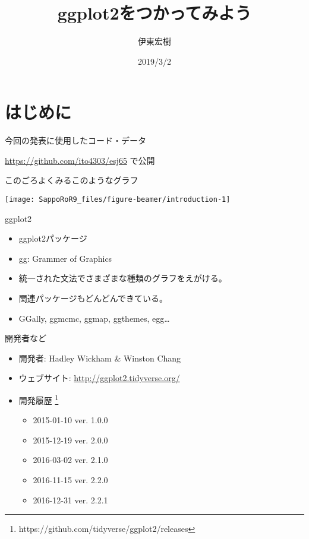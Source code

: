 \documentclass[ignorenonframetext,]{beamer}
\title{ggplot2をつかってみよう}
\author{伊東宏樹}
\date{2019/3/2}
\providecommand{\tightlist}{%
  \setlength{\itemsep}{0pt}\setlength{\parskip}{0pt}}
\begin{document}
\frame{\titlepage}

\section{はじめに}

\begin{frame}{今回の発表に使用したコード・データ}

\url{https://github.com/ito4303/esj65} で公開

\end{frame}

\begin{frame}{このごろよくみるこのようなグラフ}

\texttt{[image: SappoRoR9\_files/figure-beamer/introduction-1]}

\end{frame}

\begin{frame}{ggplot2}

\LARGE

\begin{itemize}[<+->]
\tightlist
\item
  ggplot2パッケージ
\end{itemize}

\normalsize

\begin{itemize}[<+->]
\tightlist
\item
  gg: Grammer of Graphics
\end{itemize}

\large

\begin{itemize}[<+->]
\tightlist
\item
  統一された文法でさまざまな種類のグラフをえがける。
\item
  関連パッケージもどんどんできている。
\item
  GGally, ggmcmc, ggmap, ggthemes, egg\dots
\end{itemize}

\end{frame}

\begin{frame}{開発者など}

\begin{itemize}
\tightlist
\item
  開発者: Hadley Wickham \& Winston Chang
\item
  ウェブサイト: \url{http://ggplot2.tidyverse.org/}
\item
  開発履歴 \footnote{https://github.com/tidyverse/ggplot2/releases}

  \begin{itemize}
  \tightlist
  \item
    2015-01-10 ver. 1.0.0
  \item
    2015-12-19 ver. 2.0.0
  \item
    2016-03-02 ver. 2.1.0
  \item
    2016-11-15 ver. 2.2.0
  \item
    2016-12-31 ver. 2.2.1
  \end{itemize}
\end{itemize}

\end{frame}
\end{document}
